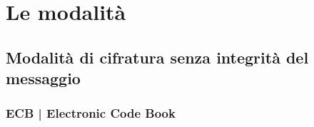 
\section{Le modalità} %


\textsf{\small }


\subsection{Modalità di cifratura senza integrità del messaggio}


\textsf{\small }

\subsubsection{ECB | Electronic Code Book}




\textsf{\small }

